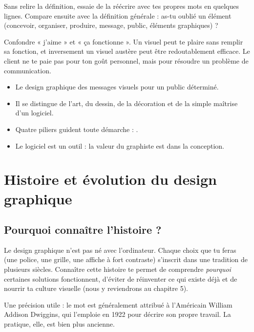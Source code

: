 Sans relire la définition, essaie de la réécrire avec tes propres mots en quelques lignes. Compare ensuite avec la définition générale : as-tu oublié un élément (concevoir, organiser, produire, message, public, éléments graphiques) ?

\begin{erreur}
Confondre « j'aime » et « ça fonctionne ». Un visuel peut te plaire sans remplir sa fonction, et inversement un visuel austère peut être redoutablement efficace. Le client ne te paie pas pour ton goût personnel, mais pour résoudre un problème de communication.
\end{erreur}

\begin{retenir}
\begin{itemize}
    \item Le design graphique  des messages visuels pour un public déterminé.
    \item Il se distingue de l'art, du dessin, de la décoration et de la simple maîtrise d'un logiciel.
    \item Quatre piliers guident toute démarche : .
    \item Le logiciel est un outil : la valeur du graphiste est dans la conception.
\end{itemize}
\end{retenir}

\section{Histoire et évolution du design graphique}

\subsection{Pourquoi connaître l'histoire ?}

Le design graphique n'est pas né avec l'ordinateur. Chaque choix que tu feras (une police, une grille, une affiche à fort contraste) s'inscrit dans une tradition de plusieurs siècles. Connaître cette histoire te permet de comprendre \emph{pourquoi} certaines solutions fonctionnent, d'éviter de réinventer ce qui existe déjà et de nourrir ta culture visuelle (nous y reviendrons au chapitre 5).

Une précision utile : le mot  est généralement attribué à l'Américain William Addison Dwiggins, qui l'emploie en 1922 pour décrire son propre travail. La pratique, elle, est bien plus ancienne.

